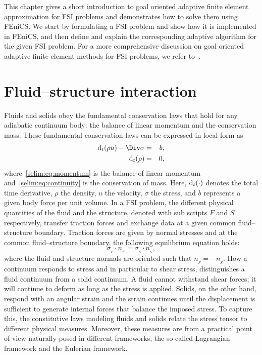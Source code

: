 This chapter gives a short introduction to goal oriented adaptive
finite element approximation for FSI problems and demonstrates how to
solve them using FEniCS. We start by formulating a FSI problem and
show how it is implemented in FEniCS, and then define and explain the
corresponding adaptive algorithm for the given FSI problem. For a more
comprehensive discussion on goal oriented adaptive finite element
methods for FSI problems, we refer
to~\citep{SelimNarayananEtAl2010,Dunne2007,GratschBathe2006,BengzonLarson2010,Van2009,FickZeeBrummelen2008}.

\section{Fluid--structure interaction}
\label{selim:sec:fsi}
Fluids and solids obey the fundamental conservation laws that hold
for any adiabatic continuum body: the balance of linear momentum and
the conservation mass.  These fundamental conservation laws can be
expressed in local form as
\begin{eqnarray}
\label{selim:eq:momentum}
\subdt(\rho u) - \Div \sigma &=& b, \\
\label{selim:eq:continuity}
\subdt(\rho )  &=& 0,
\end{eqnarray}
where~\eqref{selim:eq:momentum} is the balance of linear momentum
and~\eqref{selim:eq:continuity} is the conservation of mass.  Here,
$\textrm{d}_t(\cdot)$ denotes the total time derivative, $\rho$ the density,
$u$ the velocity, $\sigma$ the stress, and $b$ represents a given body
force per unit volume. In a FSI problem, the different physical
quantities of the fluid and the structure, denoted with sub scripts
$F$ and $S$ respectively, transfer traction forces and exchange data
at a given common fluid--structure boundary.  Traction forces are
given by normal stresses and at the common fluid--structure boundary,
the following equilibrium equation holds:
\begin{equation}
\label{selim:eq:traction}
\sigma_{_{F}}\cdot n_{_{F}} = \sigma_{_{S}}\cdot n_{_{S}},
\end{equation}
where the fluid and structure normals are oriented such that
$n_{_{F}}= -n_{_{S}}$.  How a continuum responds to stress and in
particular to shear stress, distinguishes a fluid continuum from a
solid continuum. A fluid cannot withstand shear forces; it will
continue to deform as long as the stress is applied. Solids, on the
other hand, respond with an angular strain and the strain continues
until the displacement is sufficient to generate internal forces that
balance the imposed stress. To capture this, the constitutive laws
modeling fluids and solids relate the stress tensor to different
physical measures. Moreover, these measures are from a practical point
of view naturally posed in different frameworks, the so-called
Lagrangian framework and the Eulerian framework.

